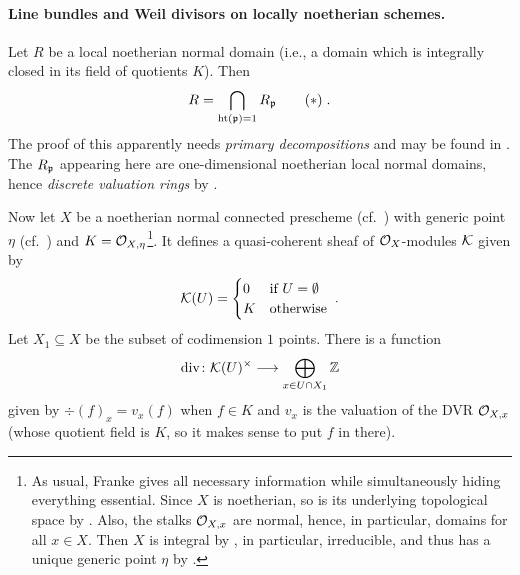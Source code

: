 \documentclass[a4paper,parskip=half,numbers=enddot, DIV=12]{scrreprt}
\begin{document}
\paragraph{Line bundles and Weil divisors on locally noetherian schemes.} Let $R$ be a local noetherian normal domain (i.e., a domain which is integrally closed in its field of quotients $K$). Then
\begin{align}\lbl{eq:IntersectionOfLocalizations}
	R=\bigcap_{\hoehe(\pp)=1}R_\pp\tag{$*$}\;.
\end{align}
The proof of this apparently needs \emph{primary decompositions} and may be found in \cite[Theorem~11.5]{matsumuraCRT}. The $R_{\mathfrak{p}}$ appearing here are one-dimensional noetherian local normal domains, hence \emph{discrete valuation rings} by \cite[Theorem~21]{alg2}.

Now let $X$ be a noetherian normal connected prescheme (cf.\ \cite[Definition~2.2.2, Definition~2.4.5]{alggeo1}) with generic point $\eta$ (cf.\ \cite[Definition~2.1.3]{alggeo1}) and $K=\mathcal{O}_{X,\eta}$\footnote{As usual, Franke gives all necessary information while simultaneously hiding everything essential. Since $X$ is noetherian, so is its underlying topological space by \cite[Fact~2.2.3]{alggeo1}. Also, the stalks $\mathcal{O}_{X,x}$ are normal, hence, in particular, domains for all $x\in X$. Then $X$ is integral by \cite[Proposition~2.1.4]{alggeo1}, in particular, irreducible, and thus has a unique generic point $\eta$ by \cite[Fact~2.1.9]{alggeo1}.}. It defines a quasi-coherent sheaf of $\mathcal{O}_X$-modules $\mathcal{K}$ given by
\begin{align*}
	\mathcal{K}(U)=\begin{cases}
		0 & \text{if }U=\emptyset\\
		K & \text{otherwise}
	\end{cases}\;.
\end{align*}
Let $X_1\subseteq X$ be the subset of codimension $1$ points. There is a function
\begin{align*}
	\div\colon \Kk(U)^\times \morphism\bigoplus_{x\in U\cap X_1}\IZ
\end{align*}
given by $\div(f)_x=v_x(f)$ when $f\in K$ and $v_x$ is the valuation of the DVR $\mathcal{O}_{X,x}$ (whose quotient field is $K$, so it makes sense to put $f$ in there).
\end{document}
